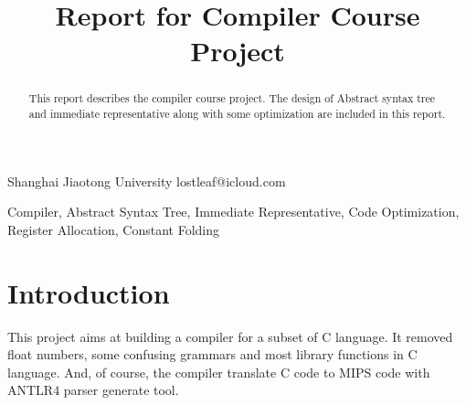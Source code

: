 \documentclass[nocopyrightspace]{sigplanconf}
\begin{document}
\copyrightdata{[to be supplied]} 


\title{Report for Compiler Course Project}

           {Shanghai Jiaotong University}
           {lostleaf@icloud.com}

\maketitle

\begin{abstract}
This report describes the compiler course project. The design of Abstract syntax tree and immediate representative along with some optimization are included in this report. 
\end{abstract}



\keywords
Compiler, Abstract Syntax Tree, Immediate Representative, Code Optimization, Register Allocation, Constant Folding

\section{Introduction}
This project aims at building a compiler for a subset of C language. It removed float numbers, some confusing grammars and most library functions in C language. And, of course, the compiler translate C code to MIPS code with ANTLR4 parser generate tool.
\end{document}
